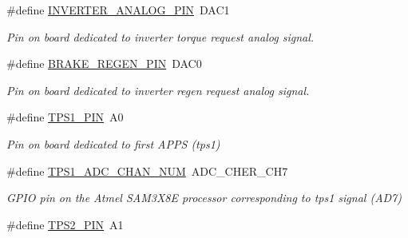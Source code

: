 \begin{DoxyCompactItemize}
\mbox{\label{group___board__model__group_gad6c9e9b63f53c664772ee858436e0ae9}} 
\#define \mbox{\hyperlink{group___board__model__group_gad6c9e9b63f53c664772ee858436e0ae9}{I\+N\+V\+E\+R\+T\+E\+R\+\_\+\+A\+N\+A\+L\+O\+G\+\_\+\+P\+IN}}~D\+A\+C1
\begin{DoxyCompactList}\small\item\em Pin on board dedicated to inverter torque request analog signal. \end{DoxyCompactList}\item 
\mbox{\label{group___board__model__group_ga604c7f4c9fe74f1d9877071bbee1c9e0}} 
\#define \mbox{\hyperlink{group___board__model__group_ga604c7f4c9fe74f1d9877071bbee1c9e0}{B\+R\+A\+K\+E\+\_\+\+R\+E\+G\+E\+N\+\_\+\+P\+IN}}~D\+A\+C0
\begin{DoxyCompactList}\small\item\em Pin on board dedicated to inverter regen request analog signal. \end{DoxyCompactList}\item 
\mbox{\label{group___board__model__group_gae9aa914854f611488701c96a330b0bd4}} 
\#define \mbox{\hyperlink{group___board__model__group_gae9aa914854f611488701c96a330b0bd4}{T\+P\+S1\+\_\+\+P\+IN}}~A0
\begin{DoxyCompactList}\small\item\em Pin on board dedicated to first A\+P\+PS (tps1) \end{DoxyCompactList}\item 
\mbox{\label{group___board__model__group_ga99b2a7dadaf495e3c559a46440f9141f}} 
\#define \mbox{\hyperlink{group___board__model__group_ga99b2a7dadaf495e3c559a46440f9141f}{T\+P\+S1\+\_\+\+A\+D\+C\+\_\+\+C\+H\+A\+N\+\_\+\+N\+UM}}~A\+D\+C\+\_\+\+C\+H\+E\+R\+\_\+\+C\+H7
\begin{DoxyCompactList}\small\item\em G\+P\+IO pin on the Atmel S\+A\+M3\+X8E processor corresponding to tps1 signal (A\+D7) \end{DoxyCompactList}\item 
\mbox{\label{group___board__model__group_gab13a816bae3ca994897fc6f1cb590a67}} 
\#define \mbox{\hyperlink{group___board__model__group_gab13a816bae3ca994897fc6f1cb590a67}{T\+P\+S2\+\_\+\+P\+IN}}~A1

\end{DoxyCompactItemize}
